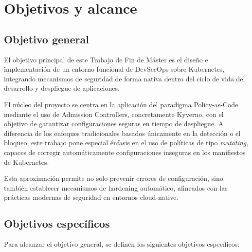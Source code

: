 \chapter{Objetivos y alcance}

\section{Objetivo general}

El objetivo principal de este Trabajo de Fin de Máster es el diseño e implementación de un entorno funcional de DevSecOps sobre Kubernetes, integrando mecanismos de seguridad de forma nativa dentro del ciclo de vida del desarrollo y despliegue de aplicaciones.

El núcleo del proyecto se centra en la aplicación del paradigma Policy-as-Code mediante el uso de Admission Controllers, concretamente Kyverno, con el objetivo de garantizar configuraciones seguras en tiempo de despliegue. A diferencia de los enfoques tradicionales basados únicamente en la detección o el bloqueo, este trabajo pone especial énfasis en el uso de políticas de tipo \textit{mutating}, capaces de corregir automáticamente configuraciones inseguras en los manifiestos de Kubernetes.

Esta aproximación permite no solo prevenir errores de configuración, sino también establecer mecanismos de hardening automático, alineados con las prácticas modernas de seguridad en entornos cloud-native.

\section{Objetivos específicos}

Para alcanzar el objetivo general, se definen los siguientes objetivos específicos:

